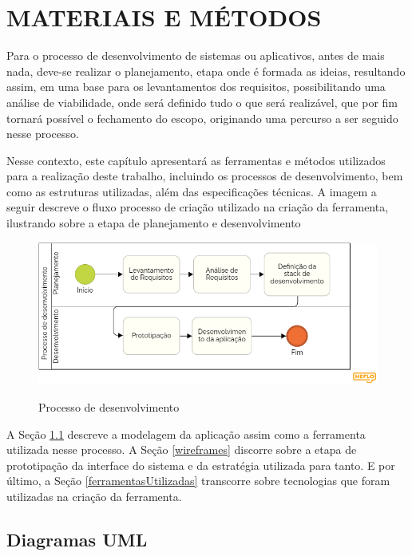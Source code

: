 %
%

\chapter{MATERIAIS E MÉTODOS}

Para o processo de desenvolvimento de sistemas ou aplicativos, antes de mais nada, deve-se realizar o planejamento, etapa onde é formada as ideias, resultando assim, em uma base para os levantamentos dos requisitos, possibilitando uma análise de viabilidade, onde será definido tudo o que será realizável, que por fim tornará possível o fechamento do escopo, originando uma percurso a ser seguido nesse processo.

Nesse contexto, este capítulo apresentará as ferramentas e métodos utilizados para a realização deste trabalho, incluindo os processos de desenvolvimento, bem como as estruturas utilizadas, além das especificações técnicas. A imagem a seguir descreve o fluxo processo de criação utilizado na criação da ferramenta, ilustrando sobre a etapa de planejamento e desenvolvimento

\begin{figure}[H]
    \centering
    \caption{Processo de desenvolvimento}
    \includegraphics[width=1\textwidth]{figuras/Processo de desenvolvimento Diagrama.png}
    \label{fig:processoDeDesenvolvimento}
    {}
\end{figure}

A Seção \ref{diagramasUML} descreve a modelagem da aplicação assim como a ferramenta utilizada nesse processo. A Seção \ref{wireframes} discorre sobre a etapa de prototipação da interface do sistema e da estratégia utilizada para tanto. E por último, a Seção \ref{ferramentasUtilizadas} transcorre sobre tecnologias que foram utilizadas na criação da ferramenta.


\section{Diagramas UML}
\label{diagramasUML}

